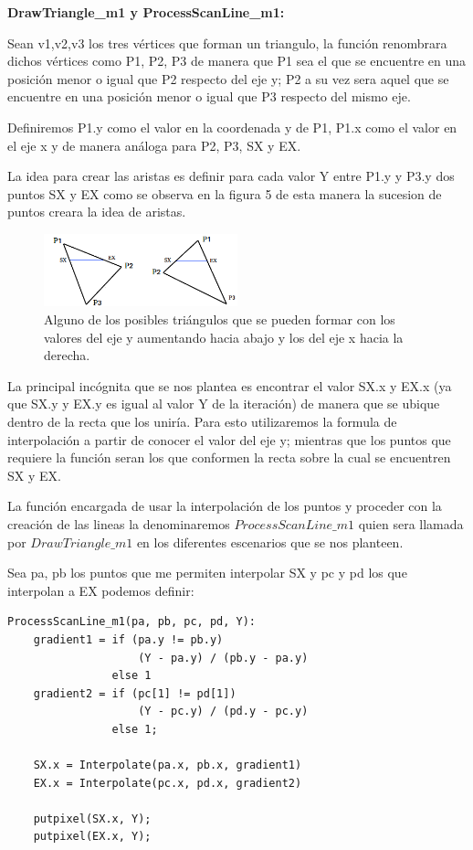 \documentclass[a4paper]{article}
\begin{document}
\textbf{DrawTriangle\_m1 y ProcessScanLine\_m1:}

\par  Sean v1,v2,v3 los tres vértices que forman un triangulo, la función renombrara dichos vértices como P1, P2, P3 de manera que P1 sea el que se encuentre en una posición menor o igual que P2 respecto del eje y;  P2 a su vez sera aquel que se encuentre en una posición menor o igual que P3 respecto del mismo eje. 
\par Definiremos P1.y como el valor en la coordenada y de P1, P1.x como el valor en el eje x y de manera análoga para P2, P3, SX y EX. 
\par La idea para crear las aristas es definir para cada valor Y entre P1.y y P3.y dos puntos SX y EX como se observa en la figura 5 de esta manera la sucesion de puntos creara la idea de aristas.


\begin{figure}[h]
    \centering
    \includegraphics[width=0.50\textwidth]{Imagenes/e.png}
    \caption{Alguno de los posibles triángulos que se pueden formar con los valores del eje y aumentando hacia abajo y los del eje x hacia la derecha.}
    \label{fig:mesh1}
\end{figure}

\par La principal incógnita que se nos plantea es encontrar el valor SX.x y EX.x (ya que SX.y y EX.y es igual al valor Y de la iteración) de manera que se ubique dentro de la recta que los uniría. Para esto utilizaremos la formula de interpolación a partir de conocer el valor del eje y; mientras que los puntos que requiere la función seran los que conformen la recta sobre la cual se encuentren SX y EX.
\par La función encargada de usar la interpolación de los puntos y proceder con la creación de las lineas la denominaremos $ProcessScanLine\_m1$ quien sera llamada por $DrawTriangle\_m1$ en los diferentes escenarios que se nos planteen.


Sea pa, pb los puntos que me permiten interpolar SX y pc y pd los que interpolan a EX podemos definir: 


\begin{verbatim}
ProcessScanLine_m1(pa, pb, pc, pd, Y):
    gradient1 = if (pa.y != pb.y) 
                    (Y - pa.y) / (pb.y - pa.y)
                else 1                          
    gradient2 = if (pc[1] != pd[1]) 
                    (Y - pc.y) / (pd.y - pc.y)
                else 1;
            
    SX.x = Interpolate(pa.x, pb.x, gradient1)
    EX.x = Interpolate(pc.x, pd.x, gradient2)
    
    putpixel(SX.x, Y);
    putpixel(EX.x, Y);
\end{verbatim}
\end{document}
